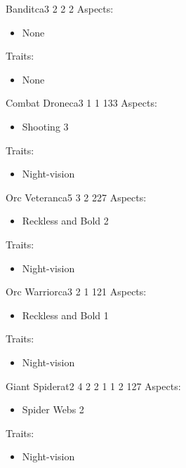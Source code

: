 \documentclass[11pt]{article}
\begin{document}
{\begin{npc}{Bandit}{ca}{3 2 2 2}{}
Aspects:
\begin{itemize}
\item None
\end{itemize}
Traits:
\begin{itemize}
\item None
\end{itemize}
\end{npc}

\begin{npc}{Combat Drone}{ca}{3 1 1 1}{33}
Aspects:
\begin{itemize}
\item Shooting 3
\end{itemize}
Traits:
\begin{itemize}
\item Night-vision
\end{itemize}
\end{npc}

\begin{npc}{Orc Veteran}{ca}{5 3 2 2}{27}
Aspects:
\begin{itemize}
\item Reckless and Bold 2
\end{itemize}
Traits:
\begin{itemize}
\item Night-vision
\end{itemize}
\end{npc}

\begin{npc}{Orc Warrior}{ca}{3 2 1 1}{21}
Aspects:
\begin{itemize}
\item Reckless and Bold 1
\end{itemize}
Traits:
\begin{itemize}
\item Night-vision
\end{itemize}
\end{npc}

\begin{npc}{Giant Spider}{at}{2 4 2 2 1 1 2 1}{27}
Aspects:
\begin{itemize}
\item Spider Webs 2
\end{itemize}
Traits:
\begin{itemize}
\item Night-vision
\end{itemize}
\end{npc}


}
\end{document}
